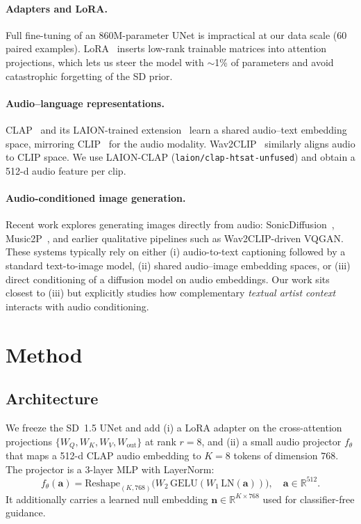 \documentclass{article}
\begin{document}
\paragraph{Adapters and LoRA.}
Full fine-tuning of an 860M-parameter UNet is impractical at our data
scale (60 paired examples). LoRA~\citep{hu2021lora} inserts low-rank
trainable matrices into attention projections, which lets us steer the
model with $\sim$1\% of parameters and avoid catastrophic forgetting of
the SD prior.

\paragraph{Audio--language representations.}
CLAP~\citep{clap2023} and its LAION-trained
extension~\citep{wu2023largescale} learn a shared audio--text embedding
space, mirroring CLIP~\citep{radford2021learning} for the audio modality.
Wav2CLIP~\citep{wav2clip2022} similarly aligns audio to CLIP space. We use
LAION-CLAP (\texttt{laion/clap-htsat-unfused}) and obtain a 512-d audio
feature per clip.

\paragraph{Audio-conditioned image generation.}
Recent work explores generating images directly from audio:
SonicDiffusion~\citep{sonicdiffusion2023}, Music2P~\citep{music2p2024},
and earlier qualitative pipelines such as Wav2CLIP-driven VQGAN. These
systems typically rely on either (i) audio-to-text captioning followed by a
standard text-to-image model, (ii) shared audio--image embedding spaces, or
(iii) direct conditioning of a diffusion model on audio embeddings. Our
work sits closest to (iii) but explicitly studies how complementary
\emph{textual artist context} interacts with audio conditioning.

\section{Method}
\label{sec:method}

\subsection{Architecture}
We freeze the SD~1.5 UNet and add (i) a LoRA adapter
\citep{hu2021lora} on the cross-attention projections
$\{W_Q, W_K, W_V, W_{\text{out}}\}$ at rank $r=8$, and (ii) a small audio
projector $f_\theta$ that maps a 512-d CLAP audio embedding to $K=8$ tokens
of dimension $768$. The projector is a 3-layer MLP with LayerNorm:
\[
  f_\theta(\mathbf{a}) = \mathrm{Reshape}_{(K, 768)}\!\Big(W_2\,\mathrm{GELU}(W_1\,\mathrm{LN}(\mathbf{a}))\Big),
  \quad \mathbf{a}\in\mathbb{R}^{512}.
\]
It additionally carries a learned null embedding
$\mathbf{n}\in\mathbb{R}^{K\times 768}$ used for classifier-free guidance.
\end{document}
